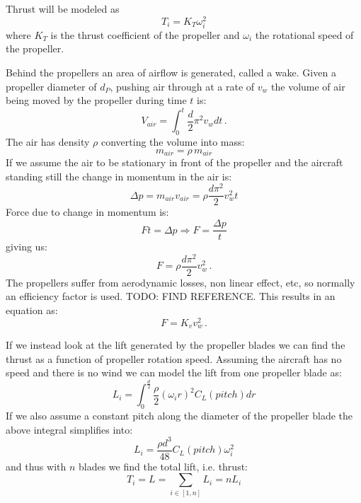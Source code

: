 Thrust will be modeled as
\begin{equation}
    T_i = K_T \omega_i^2
\end{equation}
where $K_T$ is the thrust coefficient of the propeller and $\omega_i$ the rotational speed of the propeller.

Behind the propellers an area of airflow is generated, called a wake.
Given a propeller diameter of $d_P$, pushing air through at a rate of $v_w$ the volume of air being moved by the propeller during time $t$ is:
\begin{equation}
	V_{air} = \int_0^t \frac{d}{2} \pi^2 v_w dt \,.
\end{equation}
The air has density $\rho$ converting the volume into mass:
\begin{equation}
	m_{air} = \rho \, m_{air}
\end{equation}
If we assume the air to be stationary in front of the propeller and the aircraft standing still the change in momentum in the air is:
\begin{equation}
	\Delta p = m_{air} v_{air} = \rho \frac{d \pi^2}{2} v_w^2 t
\end{equation}
Force due to change in momentum is:
\begin{equation}
	F t = \Delta p \Rightarrow F = \frac{\Delta p}{t}
\end{equation}
giving us:
\begin{equation}
	F = \rho  \frac{d \pi^2}{2} v_w^2 \, .
\end{equation}
The propellers suffer from aerodynamic losses, non linear effect, etc, so normally an efficiency factor is used. TODO: FIND REFERENCE.
This results in an equation as:
\begin{equation}
	F = K_v  v_w^2 \, .
\end{equation}

If we instead look at the lift generated by the propeller blades we can find the thrust as a function of propeller rotation speed.
Assuming the aircraft has no speed and there is no wind we can model the lift from one propeller blade as:
\begin{equation}
	L_i = \int_0^{\frac{d}{2}} \frac{\rho}{2} (\omega_i r)^2 C_L(pitch) dr
\end{equation}
If we also assume a constant pitch along the diameter of the propeller blade the above integral simplifies into:
\begin{equation}
	L_i = \frac{\rho d^3}{48} C_L(pitch) \omega_i^2
\end{equation}
and thus with $n$ blades we find the total lift, i.e. thrust:
\begin{equation}
	T_i = L = \sum_{i \in [1,n]} L_i = n L_i
\end{equation}

